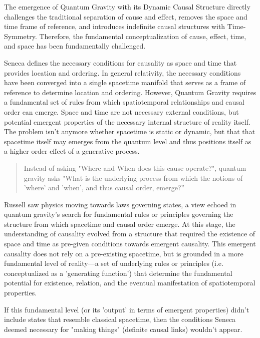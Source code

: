 The emergence of Quantum Gravity with its Dynamic Causal Structure\cite{hardy2005probability} directly challenges the traditional separation of cause and effect, removes the space and time frame of reference, and introduces indefinite causal structures\cite{mrini2024indefinitecausalstructurecausal} with Time-Symmetry. Therefore, the fundamental conceptualization of cause, effect, time, and space has been fundamentally challenged. 

Seneca defines the necessary conditions for causality as space and time that provides location and ordering. In general relativity, the necessary conditions have been converged into a single spacetime manifold that serves as a frame of reference to determine location and ordering. However, Quantum Gravity requires a fundamental set of rules from which spatiotemporal relationships and causal order can emerge. 
Space and time are not necessary external conditions, but potential emergent properties of the necessary internal structure of reality itself. The problem isn’t anymore whether spacetime is static or dynamic, but that that spacetime itself may emerges from the quantum level and thus positions itself as a higher order effect of a generative process.

\begin{quote}
    Instead of asking "Where and When does this cause operate?", quantum gravity asks "What is the underlying process from which the notions of 'where' and 'when', and thus causal order, emerge?” 
\end{quote}

Russell saw physics moving towards laws governing states, a view echoed in quantum gravity's search for fundamental rules or principles governing the structure from which spacetime and causal order emerge. At this stage, the understanding of causality evolved from a structure that required the existence of space and time as pre-given conditions towards emergent causality. This emergent causality does not rely on a pre-existing spacetime, but is grounded in a more fundamental level of reality—a set of underlying rules or principles (i.e. conceptualized as a 'generating function') that determine the fundamental potential for existence, relation, and the eventual manifestation of spatiotemporal properties.

If this fundamental level (or its 'output' in terms of emergent properties) didn't include states that resemble classical spacetime, then the conditions Seneca deemed necessary for "making things" (definite causal links) wouldn't appear.

